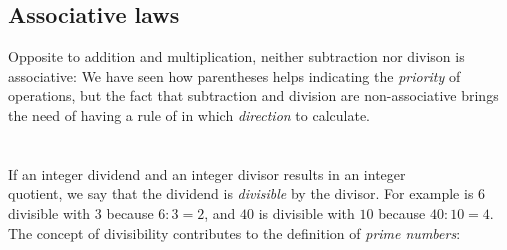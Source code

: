 
\subsection*{Associative laws}
\vsk \vsk

  \vsk

Opposite to addition and multiplication, neither subtraction nor divison is associative:
We have seen how parentheses helps indicating the \textsl{priority} of operations, but the fact that subtraction and division are non-associative brings the need of having a rule of in which \textsl{direction} to calculate. \regv


\section{\fak \label{Faktorisering}}
If an integer dividend and an integer divisor results in an integer \\quotient, we say that the dividend is \textit{divisible} by the divisor. For example is $ 6 $ divisible with $ 3 $ because $ {6:3=2} $, and $ 40 $ is divisible with $ 10 $ because $ {40:10=4} $. The concept of divisibility contributes to the definition of \textit{prime numbers}:\regv

